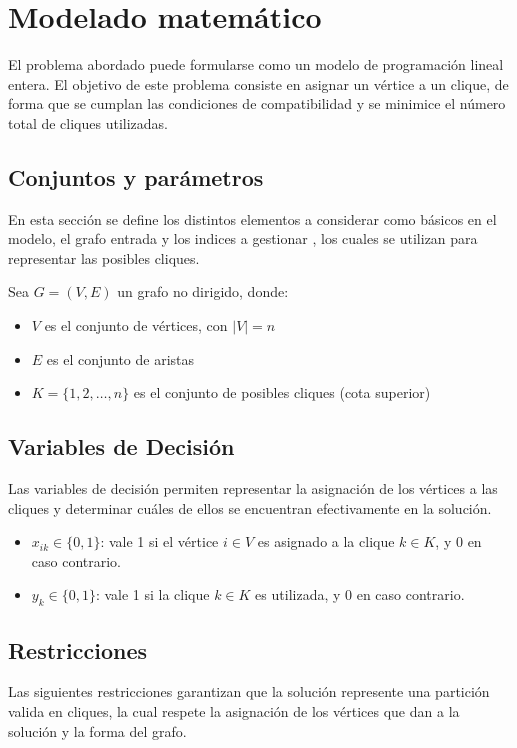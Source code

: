 \section{Modelado matemático}
El problema abordado puede formularse como un modelo de programación lineal entera. El objetivo de este problema consiste en asignar un vértice a un clique, de forma que se cumplan las condiciones de compatibilidad y se minimice el número total de cliques utilizadas.

\subsection{Conjuntos y parámetros}
En esta sección se define los distintos elementos a considerar como básicos en el modelo, el grafo entrada y los indices a gestionar , los cuales se utilizan para representar las posibles cliques.

Sea $G = (V, E)$ un grafo no dirigido, donde:
\begin{itemize}
    \item $V$ es el conjunto de vértices, con $|V| = n$
    \item $E$ es el conjunto de aristas
    \item $K = \{1,2,\dots,n\}$ es el conjunto de posibles cliques (cota superior)
\end{itemize}

\subsection{Variables de Decisión}

Las variables de decisión permiten representar la asignación de los vértices a las cliques y determinar cuáles de ellos se encuentran efectivamente en la solución.

\begin{itemize}
    \item $x_{ik} \in \{0,1\}$: vale 1 si el vértice $i \in V$ es asignado a la clique $k \in K$, y 0 en caso contrario.
    \item $y_k \in \{0,1\}$: vale 1 si la clique $k \in K$ es utilizada, y 0 en caso contrario.
\end{itemize}

\subsection{Restricciones}

Las siguientes restricciones garantizan que la solución represente una partición valida en cliques, la cual respete la asignación de los vértices que dan a la solución y la forma del grafo.

